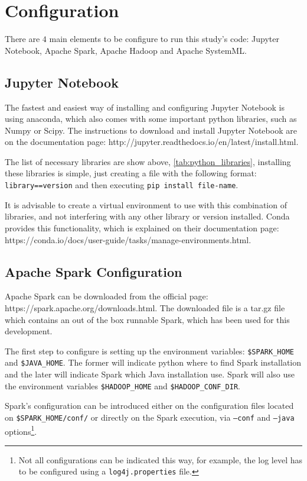\documentclass[11pt]{book} %
\newcommand{\code}[1]{\colorbox{codegray}{\texttt{#1}}}
\begin{document}
  \section{Configuration}

    There are $4$ main elements to be configure to run this study's code: Jupyter Notebook, Apache Spark, Apache Hadoop and Apache SystemML.

    \subsection{Jupyter Notebook}

      The fastest and easiest way of installing and configuring Jupyter Notebook is using anaconda, which also comes with some important python libraries, such as Numpy or Scipy. The instructions to download and install Jupyter Notebook are on the documentation page: http://jupyter.readthedocs.io/en/latest/install.html.

      The list of necessary libraries are show above, \ref{tab:python_libraries}, installing these libraries is simple, just creating a file with the following format: \code{library==version} and then executing \code{pip install file-name}.

      It is advisable to create a virtual environment to use with this combination of libraries, and not interfering with any other library or version installed. Conda provides this functionality, which is explained on their documentation page: https://conda.io/docs/user-guide/tasks/manage-environments.html.

    \subsection{Apache Spark Configuration}

      Apache Spark can be downloaded from the official page: https://spark.apache.org/downloads.html. The downloaded file is a tar.gz file which contains an out of the box runnable Spark, which has been used for this development.

      The first step to configure is setting up the environment variables: \code{\$SPARK\_HOME} and \code{\$JAVA\_HOME}. The former will indicate python where to find Spark installation and the later will indicate Spark which Java installation use. Spark will also use the environment variables \code{\$HADOOP\_HOME} and \code{\$HADOOP\_CONF\_DIR}.

      Spark's configuration can be introduced either on the configuration files located on \code{\$SPARK\_HOME/conf/} or directly on the Spark execution, via \code{--conf} and \code{--java} options\footnote{Not all configurations can be indicated this way, for example, the log level has to be configured using a \code{log4j.properties} file.}.
\end{document}
